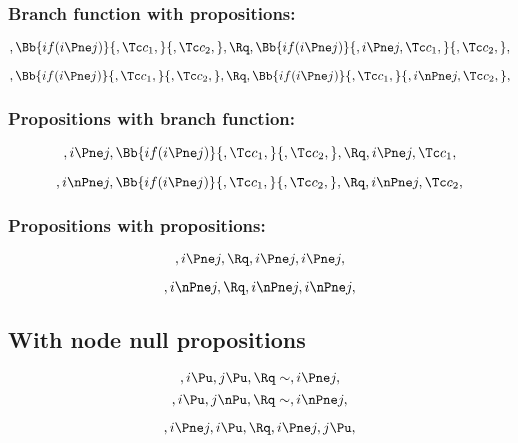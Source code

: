 \bigskip
\bigskip
\bigskip
\bigskip
\subsubsection{Branch function with propositions:}
\[, \Bb{if(i \Pne j)}{,\Tc c_1,}{,\Tc c_2,}, \Rq , \Bb{if(i \Pne j)}{,i \Pne j,\Tc c_1,}{,\Tc c_2,},\]

\[, \Bb{if(i \Pne j)}{,\Tc c_1,}{,\Tc c_2,}, \Rq , \Bb{if(i \Pne j)}{,\Tc c_1,}{,i \nPne j,\Tc c_2,},\]

\bigskip
\bigskip
\bigskip
\bigskip
\subsubsection{Propositions with branch function:}
\[,i \Pne j, \Bb{if(i \Pne j)}{,\Tc c_1,}{,\Tc c_2,}, \Rq , i \Pne j, \Tc c_1,\]

\[,i \nPne j, \Bb{if(i \Pne j)}{,\Tc c_1,}{,\Tc c_2,}, \Rq , i \nPne j, \Tc c_2,\]


\bigskip
\bigskip
\bigskip
\bigskip
\subsubsection{Propositions with propositions:}
\[,i \Pne j, \Rq , i \Pne j, i \Pne j,\]

\[,i \nPne j, \Rq , i \nPne j, i \nPne j,\]






\bigskip
\bigskip
\bigskip
\bigskip
\subsection{ With node null propositions}
\[, i \Pu, j \Pu, \Rq \sim, i \Pne j, \]
\[, i \Pu, j \nPu, \Rq \sim, i \nPne j, \]


\[, i \Pne j, i \Pu, \Rq , i \Pne j, j \Pu, \]

